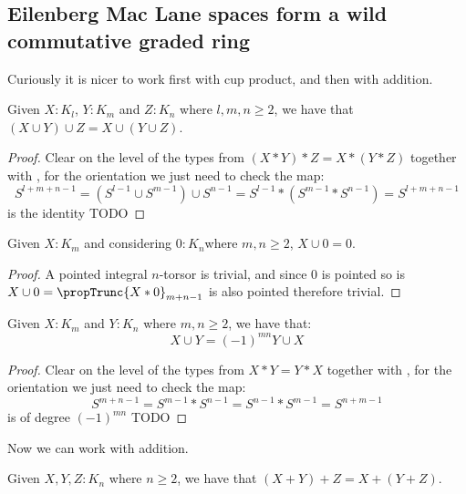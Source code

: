 



\subsection{Eilenberg Mac Lane spaces form a wild commutative graded ring}

Curiously it is nicer to work first with cup product, and then with addition.

\begin{lemma}
Given $X:K_l$, $Y:K_m$ and $Z:K_n$ where $l,m,n\geq 2$, we have that $(X\cup Y)\cup Z = X\cup (Y\cup Z)$.
\end{lemma}

\begin{proof}
Clear on the level of the types from $(X*Y)*Z = X*(Y*Z)$ together with , for the orientation we just need to check the map:
\[S^{l+m+n-1} = (S^{l-1}\cup S^{m-1})\cup S^{n-1} = S^{l-1}*(S^{m-1}*S^{n-1}) = S^{l+m+n-1}\]
is the identity TODO
\end{proof}

\begin{lemma}
Given $X:K_m$ and considering $0:K_{n}$where $m,n\geq 2$, $X\cup 0 = 0$.
\end{lemma}

\begin{proof}
A pointed integral $n$-torsor is trivial, and since $0$ is pointed so is $X\cup 0 = \propTrunc{X*0}_{m+n-1}$ is also pointed therefore trivial.
\end{proof}

\begin{lemma}
Given $X:K_{m}$ and $Y:K_{n}$ where $m,n\geq 2$, we have that:
\[X\cup Y = (-1)^{mn} Y\cup X\]
\end{lemma}

\begin{proof}
Clear on the level of the types from $X*Y = Y*X$ together with , for the orientation we just need to check the map:
\[S^{m+n-1} = S^{m-1}*S^{n-1} = S^{n-1}*S^{m-1} = S^{n+m-1}\]
is of degree $(-1)^{mn}$ TODO
\end{proof}

Now we can work with addition.

\begin{lemma}
Given $X,Y,Z:K_n$ where $n\geq 2$, we have that $(X+Y)+Z = X+(Y+Z)$.
\end{lemma}

